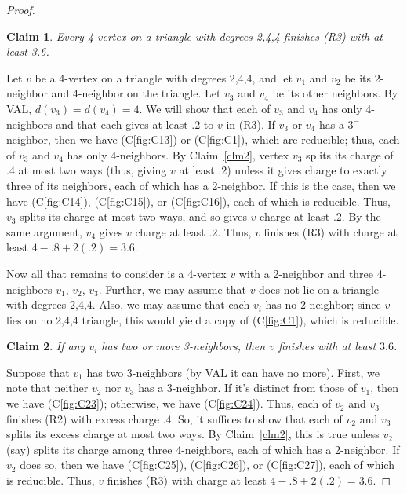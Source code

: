 \documentclass[12pt]{article}
\theoremstyle{plain}
\newtheorem{clm}{Claim}
\theoremstyle{definition}
\theoremstyle{remark}
\begin{document}
\begin{proof}
	\begin{clm}
		Every 4-vertex on a triangle with degrees 2,4,4 finishes (R3) with at least 3.6.
		\label{clm4}
	\end{clm}
	Let $v$ be a 4-vertex on a triangle with degrees 2,4,4, and let $v_1$ and $v_2$
	be its 2-neighbor and 4-neighbor on the triangle.  Let $v_3$ and $v_4$ be its
	other neighbors.  By VAL, $d(v_3)=d(v_4)=4$.  We will show that each of $v_3$
	and $v_4$ has only 4-neighbors and that each gives at least .2 to $v$ in (R3).
	If $v_3$ or $v_4$ has a $3^-$-neighbor, then we have (C\ref{fig:C13}) or
	(C\ref{fig:C1}), which are
	reducible; thus, each of $v_3$ and $v_4$ has only 4-neighbors.  By
	Claim~\ref{clm2}, vertex $v_3$ splits its charge of .4 at most two ways (thus,
	giving $v$ at least $.2$) unless it gives charge to exactly three of its
	neighbors, each of which has a 2-neighbor.  If this is the case, then we have
	(C\ref{fig:C14}), (C\ref{fig:C15}), or (C\ref{fig:C16}), each of which is
	reducible.  Thus, $v_3$ splits its charge at most two ways, and so gives $v$
	charge at least $.2$.  By the same argument, $v_4$ gives $v$ charge at least
	$.2$.  Thus, $v$ finishes (R3) with charge at least $4-.8+2(.2)=3.6$.
	\bigskip
	
	Now all that remains to consider is a 4-vertex $v$ with a 2-neighbor and three
	4-neighbors $v_1$, $v_2$, $v_3$.  Further, we may assume that $v$ does not lie
	on a triangle with degrees 2,4,4.  Also, we may assume that each $v_i$ has no
	2-neighbor; since $v$ lies on no 2,4,4 triangle, this would yield a copy of
	(C\ref{fig:C1}), which is reducible.
	
	\begin{clm}
		If any $v_i$ has two or more 3-neighbors, then $v$ finishes with at least $3.6$.
		\label{clm5}
	\end{clm}
	
	Suppose that $v_1$ has two 3-neighbors (by VAL it can have no more).  First, we
	note that neither $v_2$ nor $v_3$ has a 3-neighbor.  If it's distinct from those
	of $v_1$, then we have (C\ref{fig:C23}); otherwise, we have (C\ref{fig:C24}).
	Thus, each of $v_2$ and $v_3$ finishes (R2) with excess charge $.4$.  So, it
	suffices to show that each of $v_2$ and $v_3$ splits its excess charge at most
	two ways.  By Claim~\ref{clm2}, this is true unless $v_2$ (say) splits its
	charge among three 4-neighbors, each of which has a 2-neighbor. If $v_2$ does
	so, then we have (C\ref{fig:C25}), (C\ref{fig:C26}), or (C\ref{fig:C27}), each
	of which is reducible.  Thus, $v$ finishes (R3) with charge at least
	$4-.8+2(.2)=3.6$.
	

\end{proof}
\end{document}

